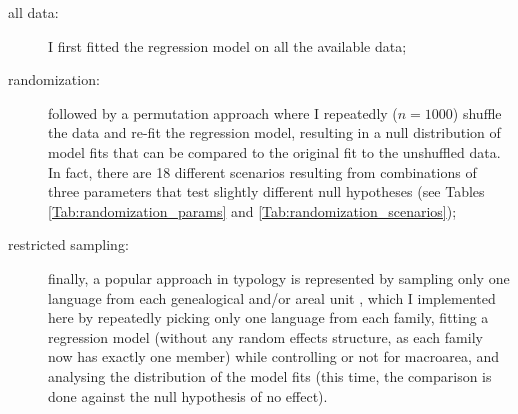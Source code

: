 \documentclass[twoside,twocolumn]{article}
\begin{document}
\begin{description}
  \item[all data:] I first fitted the regression model on all the available data;
  \item[randomization:] followed by a permutation approach where I repeatedly ($n = 1000$) shuffle the data and re-fit the regression model, resulting in a null distribution of model fits that can be compared to the original fit to the unshuffled data. In fact, there are 18 different scenarios resulting from combinations of three parameters that test slightly different null hypotheses (see Tables \ref{Tab:randomization_params} and \ref{Tab:randomization_scenarios});
  \item[restricted sampling:] finally, a popular approach in typology is represented by sampling only one language from each genealogical and/or areal unit \citep{dryer_sampling_areas_1989,bakker_sampling_language_2010,everett_climate_2015}, which I implemented here by repeatedly picking only one language from each family, fitting a regression model (without any random effects structure, as each family now has exactly one member) while controlling or not for macroarea, and analysing the distribution of the model fits (this time, the comparison is done against the null hypothesis of no effect).
\end{description}
\end{document}

